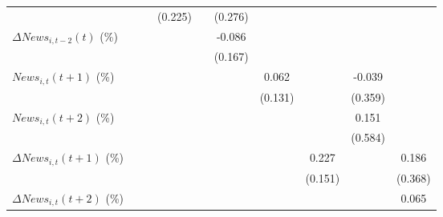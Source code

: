 {\begin{tabular}{l*{9}{c}}
                    &                     &                     &     (0.225)         &                     &     (0.276)         &                     &                     &                     &                     \\
\addlinespace
$ \Delta News_{i,t-2}(t)$ (\%)&                     &                     &                     &                     &      -0.086         &                     &                     &                     &                     \\
                    &                     &                     &                     &                     &     (0.167)         &                     &                     &                     &                     \\
\addlinespace
$ News_{i,t}(t+1)$ (\%)&                     &                     &                     &                     &                     &       0.062         &                     &      -0.039         &                     \\
                    &                     &                     &                     &                     &                     &     (0.131)         &                     &     (0.359)         &                     \\
\addlinespace
$ News_{i,t}(t+2)$ (\%)&                     &                     &                     &                     &                     &                     &                     &       0.151         &                     \\
                    &                     &                     &                     &                     &                     &                     &                     &     (0.584)         &                     \\
\addlinespace
$ \Delta News_{i,t}(t+1)$ (\%)&                     &                     &                     &                     &                     &                     &       0.227         &                     &       0.186         \\
                    &                     &                     &                     &                     &                     &                     &     (0.151)         &                     &     (0.368)         \\
\addlinespace
$ \Delta News_{i,t}(t+2)$ (\%)&                     &                     &                     &                     &                     &                     &                     &                     &       0.065         \\

\end{tabular}}
